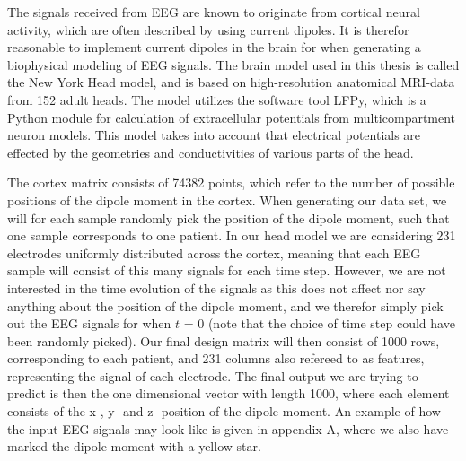 \documentclass[a4paper, UKenglish, 11pt]{uiomaster}
\begin{document}
The signals received from EEG are known to originate from cortical neural activity, which are often described by using current dipoles. It is therefor reasonable to implement current dipoles in the brain for when generating a biophysical modeling of EEG signals. The brain model used in this thesis is called the New York Head model, and is based on high-resolution anatomical MRI-data from 152 adult heads. The model utilizes the software tool LFPy, which is a Python module for calculation of extracellular potentials from multicompartment neuron models. This model takes into account that electrical potentials are effected by the geometries and conductivities of various parts of the head.

The cortex matrix consists of 74382 points, which refer to the number of possible positions of the dipole moment in the cortex. When generating our data set, we will for each sample randomly pick the position of the dipole moment, such that one sample corresponds to one patient. In our head model we are considering 231 electrodes uniformly distributed across the cortex, meaning that each EEG sample will consist of this many signals for each time step. However, we are not interested in the time evolution of the signals as this does not affect nor say anything about the position of the dipole moment, and we therefor simply pick out the EEG signals for when $t$ = 0 (note that the choice of time step could have been randomly picked). Our final design matrix will then consist of 1000 rows, corresponding to each patient, and 231 columns also refereed to as features, representing the signal of each electrode. The final output we are trying to predict is then the one dimensional vector with length 1000, where each element consists of the x-, y- and z- position of the dipole moment. An example of how the input EEG signals may look like is given in appendix A, where we also have marked the dipole moment with a yellow star.






\end{document}
